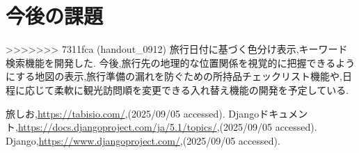 \documentclass[a4j,twocolumn]{jsarticle}
\begin{document}
\section{今後の課題}
\label{sec:org838ff3e}
>>>>>>> 7311fca (handout_0912)
旅行日付に基づく色分け表示,キーワード検索機能を開発した.
今後,旅行先の地理的な位置関係を視覚的に把握できるようにする地図の表示,旅行準備の漏れを防ぐための所持品チェックリスト機能や,日程に応じて柔軟に観光訪問順を変更できる入れ替え機能の開発を予定している.




\small\setlength\baselineskip{10pt}
\begin{thebibliography}{9}

 旅しお,\url{https://tabisio.com/},(2025/09/05 accessed).
Djangoドキュメント,\url{https://docs.djangoproject.com/ja/5.1/topics/},(2025/09/05 accessed).
Django,\url{https://www.djangoproject.com/},(2025/09/05 accessed).
\end{thebibliography}
\end{document}

